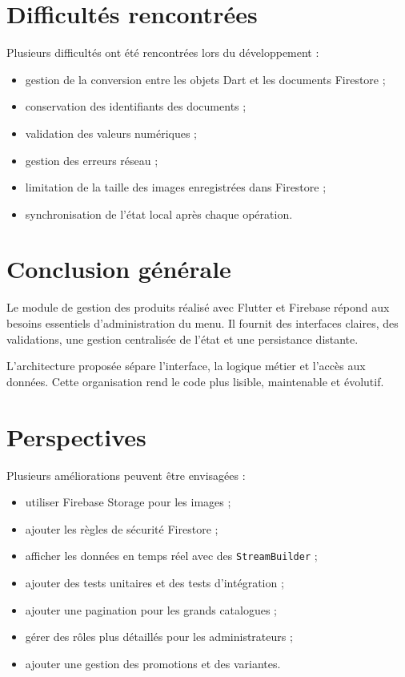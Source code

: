 \documentclass[12pt,a4paper]{report}
\begin{document}
\section{Difficultés rencontrées}

Plusieurs difficultés ont été rencontrées lors du développement :
\begin{itemize}[label=\textbullet]
  \item gestion de la conversion entre les objets Dart et les documents Firestore ;
  \item conservation des identifiants des documents ;
  \item validation des valeurs numériques ;
  \item gestion des erreurs réseau ;
  \item limitation de la taille des images enregistrées dans Firestore ;
  \item synchronisation de l'état local après chaque opération.
\end{itemize}

\section{Conclusion générale}

Le module de gestion des produits réalisé avec Flutter et Firebase répond aux
besoins essentiels d'administration du menu. Il fournit des interfaces claires,
des validations, une gestion centralisée de l'état et une persistance distante.

L'architecture proposée sépare l'interface, la logique métier et l'accès aux données.
Cette organisation rend le code plus lisible, maintenable et évolutif.

\section{Perspectives}

Plusieurs améliorations peuvent être envisagées :
\begin{itemize}[label=\textbullet]
  \item utiliser Firebase Storage pour les images ;
  \item ajouter les règles de sécurité Firestore ;
  \item afficher les données en temps réel avec des \texttt{StreamBuilder} ;
  \item ajouter des tests unitaires et des tests d'intégration ;
  \item ajouter une pagination pour les grands catalogues ;
  \item gérer des rôles plus détaillés pour les administrateurs ;
  \item ajouter une gestion des promotions et des variantes.
\end{itemize}
\end{document}

